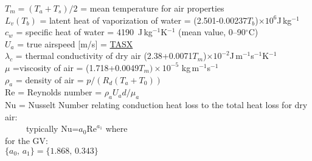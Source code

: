 \documentclass[
  english,
]{book}
\begin{document}
\(T_{m}=(T_{a}+T_{s})/2\) = mean temperature for air properties\\
\(L_{v}(T_{b})\) = latent heat of vaporization of
water
= (2.501-0.00237\(T_{b}\))\(\times10^{6}\)J\(\,\)kg\(^{-1}\)\\
\(c_{w}\) =
specific heat of water = 4190~J\(\,\)kg\(^{-1}\)K\(^{-1}\) (mean value,
0--90\(^{\circ}\)C)\\
\(U_{a}\) = true airspeed {[}m/s{]} =
\href{./4-the-state-of-the-atmosphere.html\#true-airspeed}{TASX}\\
\(\lambda_{c}\)
= thermal
conductivity
of dry air
(2.38+0.0071\(T_{m}\))\(\times10^{-2}\)J\(\,\)m\(^{-1}\)s\(^{-1}\)K\(^{-1}\)\\
\(\mu\)
=viscosity of air =
(1.718+0.0049\(T_{m})\times10^{-5}\) kg\(\,\)m\(^{-1}\)s\(^{-1}\)\\
\(\rho_{a}\) = density of
air = \(p / (R_{d}(T_{a}+T_{0}))\)\\
Re = Reynolds number =
\(\rho_{a}U_{a}d/\mu_{a}\)\\
Nu = Nusselt Number relating conduction
heat loss to the total heat loss for dry air:\\
~~~~~typically Nu=\(a_{0}\mathrm{Re}^{a_{1}}\) where\\
\hspace*{0.333em}\hspace*{0.333em}\hspace*{0.333em}\hspace*{0.333em}\hspace*{0.333em}for
the GV:\\
\hspace*{0.333em}\hspace*{0.333em}\hspace*{0.333em}\hspace*{0.333em}\hspace*{0.333em}\hspace*{0.333em}\hspace*{0.333em}\hspace*{0.333em}\(\{a_{0},\,a_{1}\}=\{1.868,\,0.343\}\)
\end{document}
